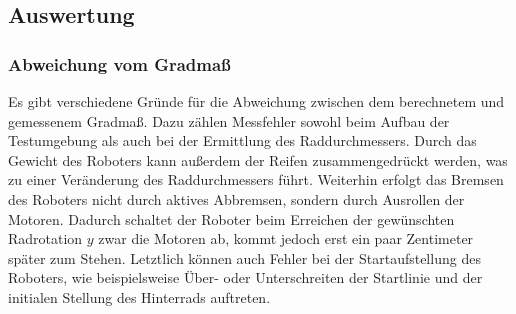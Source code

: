 \documentclass[ngerman]{tudscrreprt}
\begin{document}
\subsection{Auswertung}
\subsubsection{Abweichung vom Gradmaß}
Es gibt verschiedene Gründe für die Abweichung zwischen dem berechnetem und gemessenem
Gradmaß. Dazu zählen Messfehler sowohl beim Aufbau der Testumgebung als auch bei der
Ermittlung des Raddurchmessers. Durch das Gewicht des Roboters kann außerdem der Reifen
zusammengedrückt werden, was zu einer Veränderung des Raddurchmessers führt. Weiterhin
erfolgt das Bremsen des Roboters nicht durch aktives Abbremsen, sondern durch Ausrollen
der Motoren. Dadurch schaltet der Roboter beim Erreichen der gewünschten Radrotation
$y$ zwar die Motoren ab, kommt jedoch erst ein paar Zentimeter später zum Stehen.
Letztlich können auch Fehler bei der Startaufstellung des Roboters, wie beispielsweise
Über- oder Unterschreiten der Startlinie und der initialen Stellung des Hinterrads
auftreten.
\end{document}
